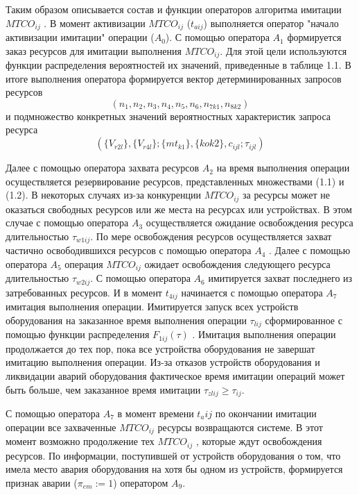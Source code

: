 Таким образом описывается состав и функции операторов алгоритма имитации $MTCO_{ij}$ . В момент активизации  $MTCO_{ij}$ ($t_{aij}$)   выполняется оператор "начало активизации имитации" операции  ($A_0$).
С помощью оператора $A_1$ формируется заказ ресурсов для имитации выполнения  $MTCO_{ij}$.  Для этой цели используются функции распределения вероятностей их значений, приведенные в таблице 1.1.  В итоге выполнения оператора   формируется вектор детерминированных запросов ресурсов
\begin{equation*}
		(n_1,n_2,n_3,n_4,n_5,n_6,n_{7k1},n_{8k2})
\end{equation*}
и подмножество конкретных значений вероятностных характеристик запроса ресурса
\begin{equation*}
        ( \{V_{r2l}\} , \{V_{r4l}\} ; \{mt_{k1}\} , \{ko{k2}\} , c_{ijl} ;\tau_{ijl} )
\end{equation*}

Далее с помощью оператора захвата ресурсов $A_2$  на время выполнения операции осуществляется резервирование ресурсов, представленных множествами (1.1) и (1.2). В некоторых случаях из-за конкуренции $MTCO_{ij}$ за ресурсы может не оказаться свободных ресурсов или же места на ресурсах или устройствах. В этом случае с помощью оператора $A_3$  осуществляется ожидание освобождения ресурса длительностью $\tau_{w1ij}$. По мере освобождения ресурсов осуществляется захват частично освободившихся ресурсов с помощью оператора $A_4$ . Далее с помощью оператора $A_5$ операция $MTCO_{ij}$ ожидает освобождения следующего ресурса длительностью $\tau_{w2ij}$.  С помощью оператора $A_6$ имитируется захват последнего из затребованных ресурсов. И в момент $t_{4ij}$  начинается с помощью оператора $A_7$ имитация выполнения операции. Имитируется запуск всех устройств оборудования на заказанное время выполнения операции $\tau_{lij}$ сформированное с помощью функции распределения $F_{1ij}(\tau)$ . Имитация выполнения операции продолжается до тех пор, пока все устройства оборудования не завершат имитацию выполнения операции. Из-за отказов устройств оборудования и ликвидации аварий  оборудования фактическое время имитации операций может быть больше, чем заказанное время имитации $\tau_{zlij} \geq \tau_{ij}$.

С помощью оператора $A_7$ в момент времени $t_aij$ по окончании имитации операции все захваченные $MTCO_{ij}$ ресурсы возвращаются системе. В этот момент возможно продолжение тех $MTCO_{ij}$ , которые ждут освобождения ресурсов. По информации, поступившей от устройств оборудования о том, что имела место авария оборудования на хотя бы одном из устройств, формируется признак аварии ($\pi_{em}:=1$) оператором $A_9$.

